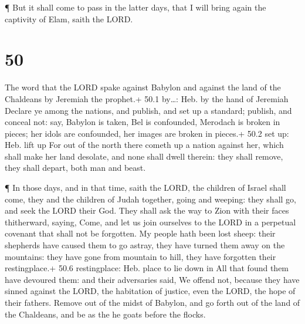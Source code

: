  ¶ But it shall come to pass in the latter days, that I
will bring again the captivity of Elam, saith the LORD.

\hypertarget{section-49}{%
\section{50}\label{section-49}}

 The word that the LORD spake against Babylon and against
the land of the Chaldeans by Jeremiah the prophet.+ 50.1 by\ldots: Heb.
by the hand of Jeremiah  Declare ye among the nations, and
publish, and set up a standard; publish, and conceal not: say, Babylon
is taken, Bel is confounded, Merodach is broken in pieces; her idols are
confounded, her images are broken in pieces.+ 50.2 set up: Heb. lift up
 For out of the north there cometh up a nation against her,
which shall make her land desolate, and none shall dwell therein: they
shall remove, they shall depart, both man and beast.

 ¶ In those days, and in that time, saith the LORD, the
children of Israel shall come, they and the children of Judah together,
going and weeping: they shall go, and seek the LORD their God.
 They shall ask the way to Zion with their faces
thitherward, saying, Come, and let us join ourselves to the LORD in a
perpetual covenant that shall not be forgotten.  My people
hath been lost sheep: their shepherds have caused them to go astray,
they have turned them away on the mountains: they have gone from
mountain to hill, they have forgotten their restingplace.+ 50.6
restingplace: Heb. place to lie down in  All that found them
have devoured them: and their adversaries said, We offend not, because
they have sinned against the LORD, the habitation of justice, even the
LORD, the hope of their fathers.  Remove out of the midst of
Babylon, and go forth out of the land of the Chaldeans, and be as the he
goats before the flocks.

